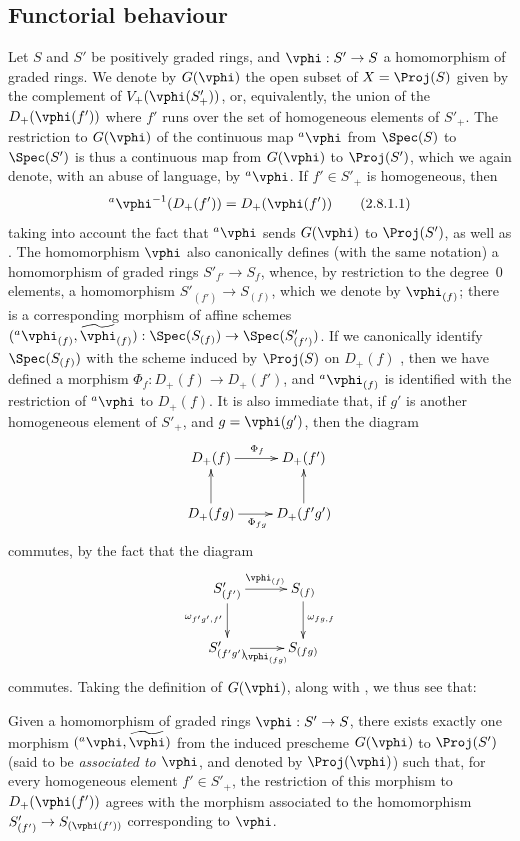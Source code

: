 \subsection{Functorial behaviour}
\label{subsection:II.2.8}

\begin{env}[2.8.1]
\label{II.2.8.1}
Let $S$ and $S'$ be positively graded rings, and $\vphi:S'\to S$ a homomorphism of graded rings.
We denote by $G(\vphi)$ the open subset of $X=\Proj(S)$ given by the complement of $V_+(\vphi(S'_+))$, or, equivalently, the union of the $D_+(\vphi(f'))$ where $f'$ runs over the set of homogeneous elements of $S'_+$.
The restriction to $G(\vphi)$ of the continuous map ${}^a\vphi$ from $\Spec(S)$ to $\Spec(S')$  is thus a continuous map from $G(\vphi)$ to $\Proj(S')$, which we again denote, with an abuse of language, by ${}^a\vphi$.
If $f'\in S'_+$ is homogeneous, then
\[
\label{II.2.8.1.1}
  {}^a\vphi^{-1}(D_+(f')) = D_+(\vphi(f'))
\tag{2.8.1.1}
\]
taking into account the fact that ${}^a\vphi$ sends $G(\vphi)$ to $\Proj(S')$, as well as .
The homomorphism $\vphi$ also canonically defines (with the same notation) a homomorphism of graded rings $S'_{f'}\to S_f$, whence, by restriction to the degree~$0$ elements,
a homomorphism $S'_{(f')}\to S_{(f)}$, which we denote by $\vphi_{(f)}$;
there is a corresponding  morphism of affine schemes $({}^a\vphi_{(f)},\widetilde{\vphi}_{(f)}):\Spec(S_{(f)})\to\Spec(S'_{(f')})$.
If we canonically identify $\Spec(S_{(f)})$ with the scheme induced by $\Proj(S)$ on $D_+(f)$ , then we have defined a morphism $\Phi_f:D_+(f)\to D_+(f')$, and ${}^a\vphi_{(f)}$ is identified with the restriction of ${}^a\vphi$ to $D_+(f)$.
It is also immediate that, if $g'$ is another homogeneous element of $S'_+$, and $g=\vphi(g')$, then the diagram
\[
  \xymatrix{
    D_+(f) \ar[r]^{\Phi_f}
    & D_+(f')
  \\D_+(fg) \ar[u] \ar[r]_{\Phi_{fg}}
    & D_+(f'g') \ar[u]
  }
\]
commutes, by the fact that the diagram
\[
  \xymatrix{
    S'_{(f')} \ar[r]^{\vphi_{(f)}} \ar[d]_{\omega_{f'g',f'}}
    & S_{(f)} \ar[d]^{\omega_{fg,f}}
  \\S'_{(f'g')} \ar[r]_{\vphi_{(fg)}}
    & S_{(fg)}
  }
\]
commutes.
Taking the definition of $G(\vphi)$, along with , we thus see that:
\end{env}

\begin{proposition}[2.8.2]
\label{II.2.8.2}
Given a homomorphism of graded rings $\vphi: S'\to S$, there exists exactly one morphism $({}^a\vphi,\widetilde{\vphi})$ from the induced prescheme $G(\vphi)$ to $\Proj(S')$ (said to be \emph{associated to $\vphi$}, and denoted by $\Proj(\vphi)$) such that, for every homogeneous element $f'\in S'_+$, the restriction of this morphism to $D_+(\vphi(f'))$ agrees with the morphism associated to the homomorphism $S'_{(f')}\to S_{(\vphi(f'))}$ corresponding to $\vphi$.
\end{proposition}

